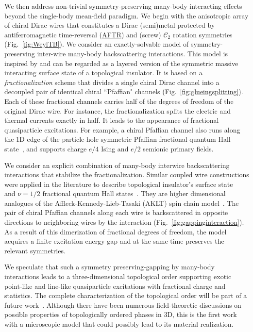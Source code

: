 We then address non-trivial symmetry-preserving many-body interacting effects beyond the single-body mean-field paradigm. We begin with the anisotropic array of chiral Dirac wires that constitutes a Dirac (semi)metal protected by antiferromagnetic time-reversal (\hyperlink{AFTR}{AFTR}) and (screw) $\mathcal{C}_2$ rotation symmetries (Fig.~\ref{fig:WeylTB}). We consider an exactly-solvable model of symmetry-preserving inter-wire many-body backscattering interactions. This model is inspired by and can be regarded as a layered version of the symmetric massive interacting surface state of a topological insulator. It is based on a {\em fractionalization} scheme that divides a single chiral Dirac channel into a decoupled pair of identical chiral ``Pfaffian" channels (Fig.~\ref{fig:glueingsplitting}). Each of these fractional channels carries half of the degrees of freedom of the original Dirac wire. For instance, the fractionalization splits the electric and thermal currents exactly in half. %
It leads to the appearance of fractional quasiparticle excitations. For example, a chiral Pfaffian channel also runs along the 1D edge of the particle-hole symmetric Pfaffian fractional quantum Hall state~\cite{Son15,BarkeshliMulliganFisher15,WangSenthil16}, and supports charge $e/4$ Ising and $e/2$ semionic primary fields.

We consider an explicit combination of many-body interwire backscattering interactions that stabilize the fractionalization. Similar coupled wire constructions were applied in the literature to describe topological insulator's surface state~\cite{MrossEssinAlicea15} and $\nu=1/2$ fractional quantum Hall states~\cite{TeoKaneCouplewires,KaneSternHalperin17}. They are higher dimensional analogues of the Affleck-Kennedy-Lieb-Tasaki (AKLT) spin chain model~\cite{AKLT1,AKLT2}. The pair of chiral Pfaffian channels along each wire is backscattered in opposite directions to neighboring wires by the interaction (Fig.~\ref{fig:gappinginteraction}). As a result of this dimerization of fractional degrees of freedom, the model acquires a finite excitation energy gap and at the same time preserves the relevant symmetries.

We speculate that such a symmetry preserving-gapping by many-body interactions leads to a three-dimensional topological order supporting exotic point-like and line-like quasiparticle excitations with fractional charge and statistics. The complete characterization of the topological order will be part of a future work~\cite{SirotaRazaTeoappearsoon}. Although there have been numerous field-theoretic discussions on possible properties of topologically ordered phases in 3D, this is the first work with a microscopic model that could possibly lead to its material realization.

